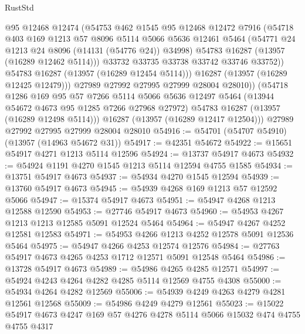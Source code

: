 \begin{lexlean}{RustStd}
\begin{coremodule}
                @95
                @12468
                @12474
                (@54753
                  @462
                  @1545
                  @95
                  @12468
                  @12472
                  @7916
                  (@54718
                    @403
                    @169
                    @1213
                    @57
                    @8096
                    @5114
                    @5066
                    @5636
                    @12461
                    @5464
                    (@54771 @24 @1213 @24 @8096 (@14131 (@54776 @24)) @34998)
                    @54783
                    @16287
                    (@13957 (@16289 @12462 @5114)))
                  @33732
                  @33735
                  @33738
                  @33742
                  @33746
                  @33752))
              @54783
              @16287
              (@13957 (@16289 @12454 @5114)))
            @16287
            (@13957 (@16289 @12425 @12479)))
          @27989
          @27992
          @27995
          @27999
          @28004
          @28010))
      (@54718
        @1286
        @169
        @95
        @57
        @7266
        @5114
        @5066
        @5636
        @12497
        @5464
        (@13944 @54672 @4673 @95 @1285 @7266 @27968 @27972)
        @54783
        @16287
        (@13957 (@16289 @12498 @5114)))
      @16287
      (@13957 (@16289 @12417 @12504)))
    @27989
    @27992
    @27995
    @27999
    @28004
    @28010
@54916 := @54701 (@54707 @54910) (@13957 (@14963 @54672 @31))
@54917 := @42351 @54672
@54922 := @15651 @54917 @4271 @1213 @5114 @12596
@54924 := @13737 @54917 @4673
@54932 := @54924 @1191 @4270 @1545 @1213 @5114 @12594 @4755 @1585
@54934 := @13751 @54917 @4673
@54937 := @54934 @4270 @1545 @12594
@54939 := @13760 @54917 @4673
@54945 := @54939 @4268 @169 @1213 @57 @12592 @5066
@54947 := @15374 @54917 @4673
@54951 := @54947 @4268 @1213 @12588 @12590
@54953 := @27746 @54917 @4673
@54960 := @54953 @4267 @1213 @1213 @12585 @5091 @12524 @5464
@54964 := @54947 @4267 @4252 @12581 @12583
@54971 := @54953 @4266 @1213 @4252 @12578 @5091 @12536 @5464
@54975 := @54947 @4266 @4253 @12574 @12576
@54984 := @27763 @54917 @4673 @4265 @4253 @1712 @12571 @5091 @12548 @5464
@54986 := @13728 @54917 @4673
@54989 := @54986 @4265 @4285 @12571
@54997 := @54924 @4243 @4264 @4282 @4285 @5114 @12569 @4755 @4308
@55000 := @54934 @4264 @4282 @12569
@55006 := @54939 @4249 @4263 @4279 @4281 @12561 @12568
@55009 := @54986 @4249 @4279 @12561
@55023 := @15022 @54917 @4673 @4247 @169 @57 @4276 @4278 @5114 @5066 @15032 @474 @4755 @4755 @4317

\end{coremodule}
\end{lexlean}
